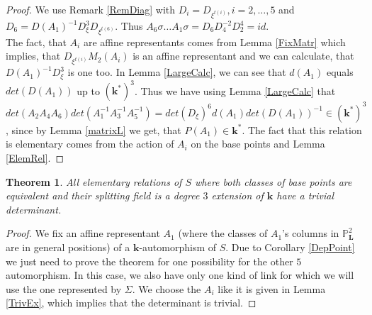 \documentclass[12pt, oneside, reqno]{amsart}
\newtheorem{theorem}{Theorem}[section]
\begin{document}
\begin{proof}
    We use Remark \ref{RemDiag} with $D_i = D_{\xi^{t(i)}}, i = 2, \dots , 5$ and $D_6 = D(A_1)^{-1}D_{\xi}^3D_{\xi^{t(6)}}$. Thus $A_6 \sigma \dots A_1 \sigma = D_6 D_4^{-2}D_2^4 = id$. \\
    The fact, that $A_i$ are affine representants comes from Lemma \ref{FixMatr} which implies, that $D_{\xi^{t(i)}}M_2(A_i)$ is an affine representant and we can calculate, that $D(A_1)^{-1}D_{\xi}^3$ is one too. In Lemma \ref{LargeCalc}, we can see that $d(A_1)$ equals $det(D(A_1))$ up to $(\textbf{k}^*)^3$. Thus we have using Lemma \ref{LargeCalc} that $det(A_2A_4A_6)det(A_1^{-1}A_3^{-1}A_5^{-1}) = det(D_{\xi})^6d(A_1) det(D(A_1))^{-1} \in (\textbf{k}^*)^3$, since by Lemma \ref{matrixL} we get, that $P(A_1) \in \textbf{k}^*$. The fact that this relation is elementary comes from the action of $A_i$ on the base points and Lemma \ref{ElemRel}. 
\end{proof}
\begin{theorem} \label{TrivialCase}
    All elementary relations of $S$ where both classes of base points are equivalent and their splitting field is a degree $3$ extension of $\textbf{k}$ have a trivial determinant.  
\end{theorem}
\begin{proof}
     We fix an affine representant $A_1$ (where the classes of $A_1$'s columns in $\mathbb{P}^2_{\textbf{L}}$ are in general positions) of a $\textbf{k}$-automorphism of $S$. Due to Corollary \ref{DepPoint} we just need to prove the theorem for one possibility for the other $5$ automorphism. In this case, we also have only one kind of link for which we will use the one represented by $\Sigma$. We choose the $A_i$ like it is given in Lemma \ref{TrivEx}, which implies that the determinant is trivial.
\end{proof}
\end{document}
